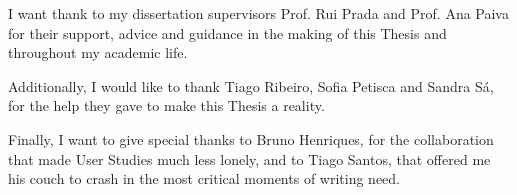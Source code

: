 
I want thank to my dissertation supervisors Prof. Rui Prada and Prof. Ana Paiva for their support, advice and guidance in the making of this Thesis and throughout my academic life.

Additionally, I would like to thank Tiago Ribeiro, Sofia Petisca and Sandra Sá, for the help they gave to make this Thesis a reality.



Finally, I want to give special thanks to Bruno Henriques, for the collaboration that made User Studies much less lonely, and to Tiago Santos, that offered me his couch to crash in the most critical moments of writing need.